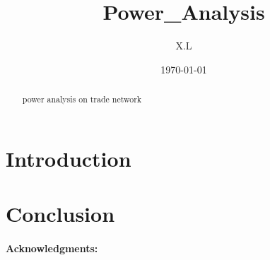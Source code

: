 \documentclass[11pt,a4paper]{article}
\begin{document}
\title{ Power_Analysis }

\author{ X.L }
\date{\today}
\maketitle

\begin{abstract}
 power analysis on trade network
\end{abstract}

\section{Introduction}


\section{Conclusion}

\newpage 

\paragraph*{Acknowledgments:}



\end{document}
